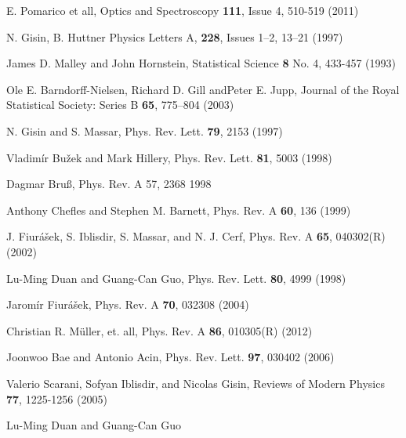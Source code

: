 \documentclass[aps,prl,twocolumn,showpacs]{revtex4}
\begin{document}
\begin{thebibliography}{99}

E. Pomarico et all, Optics and Spectroscopy \textbf{111}, Issue 4, 510-519 (2011)


 N. Gisin, B. Huttner Physics Letters A, \textbf{ 228}, Issues 1–2, 13–21 (1997)

 James D. Malley and John Hornstein, Statistical Science \textbf{8}  No. 4,  433-457 (1993)

 Ole E. Barndorff-Nielsen, Richard D. Gill andPeter E. Jupp, Journal of the Royal Statistical Society: Series B 
\textbf{65}, 775–804 (2003)

N. Gisin and S. Massar, Phys. Rev. Lett. \textbf{79}, 2153 (1997)

 Vladimír Bužek and Mark Hillery, Phys. Rev. Lett. \textbf{81}, 5003 (1998)

Dagmar Bruß, Phys. Rev. A 57, 2368  { 1998}


 Anthony Chefles and Stephen M. Barnett, Phys. Rev. A \textbf{60}, 136  (1999)

 J. Fiurášek, S. Iblisdir, S. Massar, and N. J. Cerf, Phys. Rev. A \textbf{65}, 040302(R) (2002)


 Lu-Ming Duan and Guang-Can Guo, Phys. Rev. Lett. \textbf{80}, 4999  (1998)


 Jaromír Fiurášek,  Phys. Rev. A \textbf{70}, 032308 (2004)


 Christian R. Müller, et. all, Phys. Rev. A \textbf{86}, 010305(R) (2012)

 Joonwoo Bae and Antonio Acin, Phys. Rev. Lett. \textbf{97}, 030402 (2006)

 Valerio Scarani, Sofyan Iblisdir, and Nicolas Gisin, Reviews of Modern Physics \textbf{77}, 1225-1256 (2005)













Lu-Ming Duan and Guang-Can Guo
\end{thebibliography}     
\end{document}
